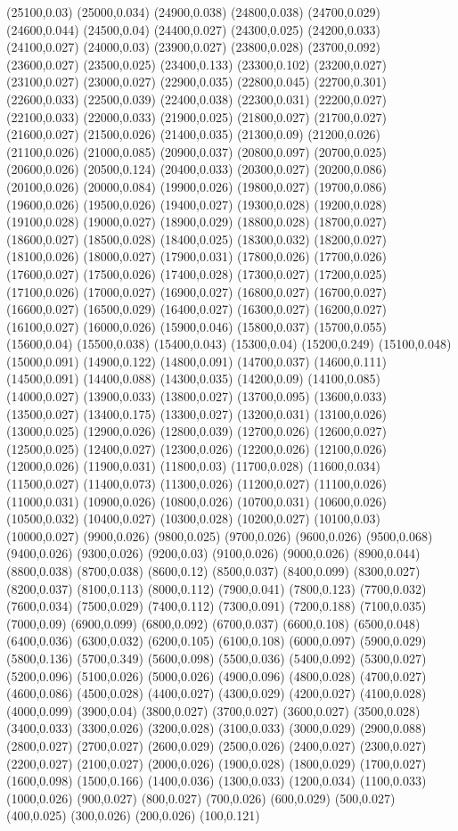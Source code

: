 (25100,0.03)
(25000,0.034)
(24900,0.038)
(24800,0.038)
(24700,0.029)
(24600,0.044)
(24500,0.04)
(24400,0.027)
(24300,0.025)
(24200,0.033)
(24100,0.027)
(24000,0.03)
(23900,0.027)
(23800,0.028)
(23700,0.092)
(23600,0.027)
(23500,0.025)
(23400,0.133)
(23300,0.102)
(23200,0.027)
(23100,0.027)
(23000,0.027)
(22900,0.035)
(22800,0.045)
(22700,0.301)
(22600,0.033)
(22500,0.039)
(22400,0.038)
(22300,0.031)
(22200,0.027)
(22100,0.033)
(22000,0.033)
(21900,0.025)
(21800,0.027)
(21700,0.027)
(21600,0.027)
(21500,0.026)
(21400,0.035)
(21300,0.09)
(21200,0.026)
(21100,0.026)
(21000,0.085)
(20900,0.037)
(20800,0.097)
(20700,0.025)
(20600,0.026)
(20500,0.124)
(20400,0.033)
(20300,0.027)
(20200,0.086)
(20100,0.026)
(20000,0.084)
(19900,0.026)
(19800,0.027)
(19700,0.086)
(19600,0.026)
(19500,0.026)
(19400,0.027)
(19300,0.028)
(19200,0.028)
(19100,0.028)
(19000,0.027)
(18900,0.029)
(18800,0.028)
(18700,0.027)
(18600,0.027)
(18500,0.028)
(18400,0.025)
(18300,0.032)
(18200,0.027)
(18100,0.026)
(18000,0.027)
(17900,0.031)
(17800,0.026)
(17700,0.026)
(17600,0.027)
(17500,0.026)
(17400,0.028)
(17300,0.027)
(17200,0.025)
(17100,0.026)
(17000,0.027)
(16900,0.027)
(16800,0.027)
(16700,0.027)
(16600,0.027)
(16500,0.029)
(16400,0.027)
(16300,0.027)
(16200,0.027)
(16100,0.027)
(16000,0.026)
(15900,0.046)
(15800,0.037)
(15700,0.055)
(15600,0.04)
(15500,0.038)
(15400,0.043)
(15300,0.04)
(15200,0.249)
(15100,0.048)
(15000,0.091)
(14900,0.122)
(14800,0.091)
(14700,0.037)
(14600,0.111)
(14500,0.091)
(14400,0.088)
(14300,0.035)
(14200,0.09)
(14100,0.085)
(14000,0.027)
(13900,0.033)
(13800,0.027)
(13700,0.095)
(13600,0.033)
(13500,0.027)
(13400,0.175)
(13300,0.027)
(13200,0.031)
(13100,0.026)
(13000,0.025)
(12900,0.026)
(12800,0.039)
(12700,0.026)
(12600,0.027)
(12500,0.025)
(12400,0.027)
(12300,0.026)
(12200,0.026)
(12100,0.026)
(12000,0.026)
(11900,0.031)
(11800,0.03)
(11700,0.028)
(11600,0.034)
(11500,0.027)
(11400,0.073)
(11300,0.026)
(11200,0.027)
(11100,0.026)
(11000,0.031)
(10900,0.026)
(10800,0.026)
(10700,0.031)
(10600,0.026)
(10500,0.032)
(10400,0.027)
(10300,0.028)
(10200,0.027)
(10100,0.03)
(10000,0.027)
(9900,0.026)
(9800,0.025)
(9700,0.026)
(9600,0.026)
(9500,0.068)
(9400,0.026)
(9300,0.026)
(9200,0.03)
(9100,0.026)
(9000,0.026)
(8900,0.044)
(8800,0.038)
(8700,0.038)
(8600,0.12)
(8500,0.037)
(8400,0.099)
(8300,0.027)
(8200,0.037)
(8100,0.113)
(8000,0.112)
(7900,0.041)
(7800,0.123)
(7700,0.032)
(7600,0.034)
(7500,0.029)
(7400,0.112)
(7300,0.091)
(7200,0.188)
(7100,0.035)
(7000,0.09)
(6900,0.099)
(6800,0.092)
(6700,0.037)
(6600,0.108)
(6500,0.048)
(6400,0.036)
(6300,0.032)
(6200,0.105)
(6100,0.108)
(6000,0.097)
(5900,0.029)
(5800,0.136)
(5700,0.349)
(5600,0.098)
(5500,0.036)
(5400,0.092)
(5300,0.027)
(5200,0.096)
(5100,0.026)
(5000,0.026)
(4900,0.096)
(4800,0.028)
(4700,0.027)
(4600,0.086)
(4500,0.028)
(4400,0.027)
(4300,0.029)
(4200,0.027)
(4100,0.028)
(4000,0.099)
(3900,0.04)
(3800,0.027)
(3700,0.027)
(3600,0.027)
(3500,0.028)
(3400,0.033)
(3300,0.026)
(3200,0.028)
(3100,0.033)
(3000,0.029)
(2900,0.088)
(2800,0.027)
(2700,0.027)
(2600,0.029)
(2500,0.026)
(2400,0.027)
(2300,0.027)
(2200,0.027)
(2100,0.027)
(2000,0.026)
(1900,0.028)
(1800,0.029)
(1700,0.027)
(1600,0.098)
(1500,0.166)
(1400,0.036)
(1300,0.033)
(1200,0.034)
(1100,0.033)
(1000,0.026)
(900,0.027)
(800,0.027)
(700,0.026)
(600,0.029)
(500,0.027)
(400,0.025)
(300,0.026)
(200,0.026)
(100,0.121)
